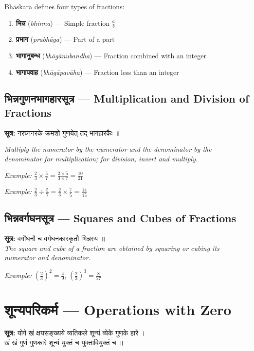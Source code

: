 \documentclass[10pt,a4paper]{article}
\newenvironment{sanskritverse}{%
  \begin{center}%
  \begin{minipage}{0.94\textwidth}%
  \centering\devanagarifont\small%
}{%
  \end{minipage}%
  \end{center}%
  \vspace{0.1em}%
}
\newcommand{\sutratxt}[2]{%
  \begin{center}%
  \colorbox{sanskritbg}{%
    \begin{minipage}{0.93\textwidth}%
    \centering\small\vspace{3pt}%
    {\devanagarifont\textbf{सूत्र:} #1}\par\vspace{2pt}%
    \textit{#2}\vspace{3pt}%
    \end{minipage}%
  }%
  \end{center}%
  \vspace{0.1em}%
}
\begin{document}
Bhāskara defines four types of fractions:
\begin{enumerate}[itemsep=0pt]
\item \textbf{भिन्न} (\textit{bhinna}) --- Simple fraction $\frac{a}{b}$
\item \textbf{प्रभाग} (\textit{prabhāga}) --- Part of a part
\item \textbf{भागानुबन्ध} (\textit{bhāgānubandha}) --- Fraction combined with an integer
\item \textbf{भागापवाह} (\textit{bhāgāpavāha}) --- Fraction less than an integer
\end{enumerate}

\subsection{भिन्नगुणनभागहारसूत्र — Multiplication and Division of Fractions}

\sutratxt{नरघ्ननरके क्रमशो गुणयेत् तद् भागहारकैः ॥}{Multiply the numerator by the numerator and the denominator by the denominator for multiplication; for division, invert and multiply.}

\textit{Example:} $\frac{2}{3} \times \frac{5}{7} = \frac{2 \times 5}{3 \times 7} = \frac{10}{21}$

\textit{Example:} $\frac{2}{3} \div \frac{5}{7} = \frac{2}{3} \times \frac{7}{5} = \frac{14}{15}$

\subsection{भिन्नवर्गघनसूत्र — Squares and Cubes of Fractions}

\begin{sanskritverse}
\textbf{सूत्र:} वर्गोघनौ च वर्गघनकारकृतौ भिन्नस्य ॥\\
\textit{The square and cube of a fraction are obtained by squaring or cubing its numerator and denominator.}
\end{sanskritverse}

\textit{Example:} $\left(\frac{2}{3}\right)^2 = \frac{4}{9}$, \quad $\left(\frac{2}{3}\right)^3 = \frac{8}{27}$

\section{शून्यपरिकर्म — Operations with Zero}
\label{sec:shunya}

\begin{sanskritverse}
\textbf{सूत्र:} योगे खं क्षयसङ्ख्यये व्यतिकले शून्यं व्येके गुणके हारे ।\\
खं खं गुणं गुणकारे शून्यं युक्तं च युक्तावियुक्तं च ॥
\end{sanskritverse}
\end{document}
